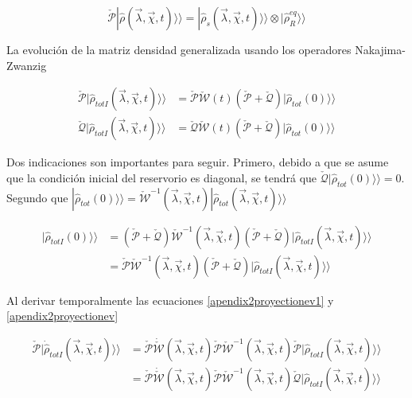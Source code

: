 \begin{appendixs}
\begin{equation*}
    \check{\mathcal{P}}|\hat{\rho}(\vec{\lambda},\vec{\chi},t) \rangle \rangle = |\hat{\rho}_{s}(\vec{\lambda},\vec{\chi},t)\rangle \rangle \otimes |\hat{\rho}^{eq}_{R}\rangle \rangle 
\end{equation*}

La evolución de la matriz densidad generalizada usando los operadores Nakajima-Zwanzig

\begin{align}
    \check{\mathcal{P}}|\hat{\rho}_{totI}(\vec{\lambda},\vec{\chi},t)\rangle \rangle & =  \check{\mathcal{P}} \check{\mathcal{W}}(t)( \check{\mathcal{P}} +  \check{\mathcal{Q}})|\hat{\rho}_{tot}(0)\rangle \rangle  \label{apendix2proyectionev1} \\
    \check{\mathcal{Q}}|\hat{\rho}_{totI}(\vec{\lambda},\vec{\chi},t)\rangle \rangle & = \check{\mathcal{Q}} \check{\mathcal{W}}(t)( \check{\mathcal{P}} +  \check{\mathcal{Q}})|\hat{\rho}_{tot}(0)\rangle \rangle 
\label{apendix2proyectionev}
\end{align}

Dos indicaciones son importantes para seguir. Primero, debido a que se asume que la condición inicial del reservorio es diagonal, se tendrá que $\check{\mathcal{Q}}|\hat{\rho}_{tot}(0)\rangle\rangle = 0 $. Segundo 
 que $|\hat{\rho}_{tot}(0)\rangle \rangle = \check{\mathcal{W}}^{-1}(\vec{\lambda},\vec{\chi},t)|\hat{\rho}_{tot}(\vec{\lambda},\vec{\chi},t)\rangle \rangle$

\begin{align*}
    |\hat{\rho}_{totI}(0)\rangle \rangle & = (\check{\mathcal{P}} + \check{\mathcal{Q}} )\check{\mathcal{W}}^{-1}(\vec{\lambda},\vec{\chi},t)(\check{\mathcal{P}} + \check{\mathcal{Q}})|\hat{\rho}_{totI}(\vec{\lambda},\vec{\chi},t)\rangle \rangle \\
        & = \check{\mathcal{P}}\check{\mathcal{W}}^{-1}(\vec{\lambda},\vec{\chi},t)(\check{\mathcal{P}} + \check{\mathcal{Q}})|\hat{\rho}_{totI}(\vec{\lambda},\vec{\chi},t)\rangle \rangle
\end{align*}

Al derivar temporalmente las ecuaciones \ref{apendix2proyectionev1} y \ref{apendix2proyectionev} 

\begin{align*}
    \check{\mathcal{P}}|\dot{\hat{\rho}}_{totI}(\vec{\lambda},\vec{\chi},t) \rangle \rangle & = \check{\mathcal{P}}\dot{\check{\mathcal{W}}}(\vec{\lambda},\vec{\chi},t)\check{\mathcal{P}}\check{\mathcal{W}}^{-1}(\vec{\lambda},\vec{\chi},t)\check{\mathcal{P}}|\hat{\rho}_{totI}(\vec{\lambda},\vec{\chi},t)\rangle \rangle \\
     & = \check{\mathcal{P}}\dot{\check{\mathcal{W}}}(\vec{\lambda},\vec{\chi},t)\check{\mathcal{P}}\check{\mathcal{W}}^{-1}(\vec{\lambda},\vec{\chi},t)\check{\mathcal{Q}}|\hat{\rho}_{totI}(\vec{\lambda},\vec{\chi},t)\rangle \rangle 
\end{align*}


\end{appendixs}
